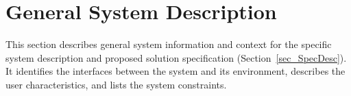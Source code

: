 \section{General System Description}
\label{sec_genDesc}

This section describes general system information and context for the specific
system description and proposed solution specification
(Section~\ref{sec_SpecDesc}). It identifies the interfaces between the system
and its environment, describes the user characteristics, and lists the system
constraints.





